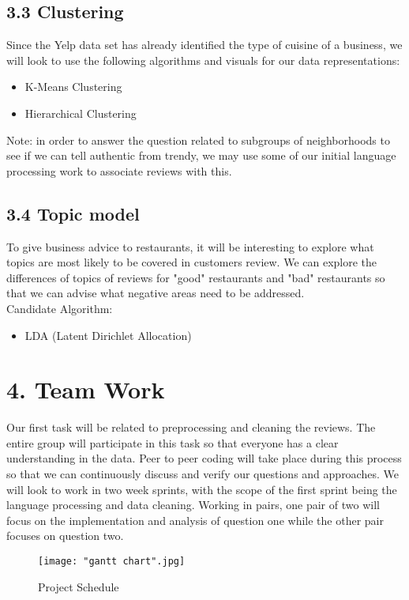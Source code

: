 \documentclass{neu_handout}
\begin{document}
\subsection*{3.3 Clustering}
Since the Yelp data set has already identified the type of cuisine of a business, we will look to use the following algorithms and visuals for our data representations:\\
\begin{itemize}
	\item K-Means Clustering
	\item Hierarchical Clustering
\end{itemize}
Note: in order to answer the question related to subgroups of neighborhoods to see if we can tell authentic from trendy, we may use some of our initial language processing work to associate reviews with this.

\subsection*{3.4 Topic model}
To give business advice to restaurants, it will be interesting to explore what topics are most likely to be covered in customers review. We can explore the differences of topics of reviews for "good" restaurants and "bad" restaurants so that we can advise what negative areas need to be addressed.\\
Candidate Algorithm:
\begin{itemize}
	\item LDA (Latent Dirichlet Allocation)
\end{itemize}


\section*{4. Team Work}
Our first task will be related to preprocessing and cleaning the reviews. The entire group will participate in this task so that everyone has a clear understanding in the data. Peer to peer coding will take place during this process so that we can continuously discuss and verify our questions and approaches. We will look to work in two week sprints, with the scope of the first sprint being the language processing and data cleaning. Working in pairs, one pair of two will focus on the implementation and analysis of question one while the other pair focuses on question two.

\begin{figure}[h!]
	\caption{Project Schedule}
	\centering
	\texttt{[image: "gantt chart".jpg]}
\end{figure}
\end{document}
